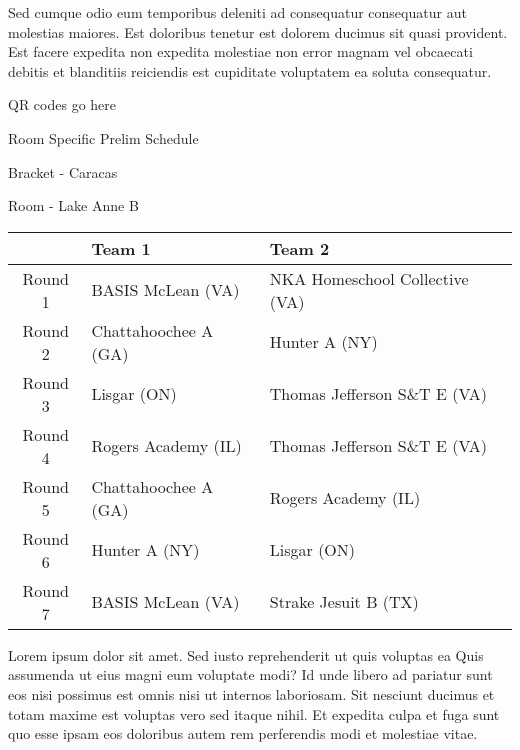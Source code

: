 \documentclass{article}%
\begin{document}
\newline%
Sed cumque odio eum temporibus deleniti ad consequatur consequatur aut molestias maiores. Est doloribus tenetur est dolorem ducimus sit quasi provident. Est facere expedita non expedita molestiae non error magnam vel obcaecati debitis et blanditiis reiciendis est cupiditate voluptatem ea soluta consequatur.%
\vspace*{140pt}%
\begin{center}%
\begin{Huge}%
QR codes go here%
\end{Huge}%
\end{center}%
\newpage%
\begin{center}%
\begin{Huge}%
Room Specific Prelim Schedule%
\end{Huge}%
\vspace*{8pt}%
\linebreak%
\begin{Large}%
Bracket {-} Caracas%
\end{Large}%
\vspace*{8pt}%
\linebreak%
\vspace*{8pt}%
\begin{Large}%
Room {-} Lake Anne B%
\end{Large}%
\end{center}%
%
\begin{tabularx}{\textwidth}{|c|Y|Y|}%
\hline%
&Team 1&Team 2\\%
\hline%
Round 1&BASIS McLean (VA)&NKA Homeschool Collective (VA)\\%
Round 2&Chattahoochee A (GA)&Hunter A (NY)\\%
Round 3&Lisgar (ON)&Thomas Jefferson S\&T E (VA)\\%
Round 4&Rogers Academy (IL)&Thomas Jefferson S\&T E (VA)\\%
Round 5&Chattahoochee A (GA)&Rogers Academy (IL)\\%
Round 6&Hunter A (NY)&Lisgar (ON)\\%
Round 7&BASIS McLean (VA)&Strake Jesuit B (TX)\\%
\hline%
\end{tabularx}%
\vspace*{8pt}%
\newline%
Lorem ipsum dolor sit amet. Sed iusto reprehenderit ut quis voluptas ea Quis assumenda ut eius magni eum voluptate modi? Id unde libero ad pariatur sunt eos nisi possimus est omnis nisi ut internos laboriosam. Sit nesciunt ducimus et totam maxime est voluptas vero sed itaque nihil. Et expedita culpa et fuga sunt quo esse ipsam eos doloribus autem rem perferendis modi et molestiae vitae.\newline%
\end{document}
